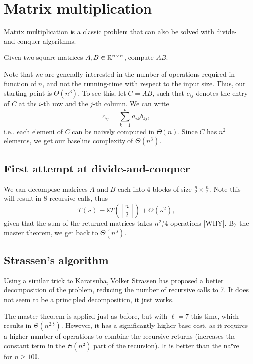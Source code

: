 
\section*{Matrix multiplication}

Matrix multiplication is a classic problem that can also be solved with divide-and-conquer algorithms.

\begin{problem}
    Given two square matrices $A,B \in \mathbb{R}^{n\times n}$, compute $A B$.
\end{problem}

Note that we are generally interested in the number of operations required in function of $n$, and not the running-time with respect to the input size.
Thus, our starting point is $\Theta(n^3)$.
To see this, let $C = AB$, such that $c_{ij}$ denotes the entry of $C$ at the $i$-th row and the $j$-th column.
We can write \[
c_{ij} = \sum_{k=1}^{n} a_{ik}b_{kj}
,\] i.e., each element of $C$ can be naively computed in $\Theta(n)$.
Since  $C$ has $n^2$ elements, we get our baseline complexity of $\Theta(n^3)$.

\subsection*{First attempt at divide-and-conquer}

We can decompose matrices $A$ and $B$ each into 4 blocks of size $\frac{n}{2}\times \frac{n}{2}$.
Note this will result in 8 recursive calls, thus \[
T(n) = 8T(\left\lceil \frac{n}{2} \right\rceil ) + \Theta(n^2)
,\] given that the sum of the returned matrices takes $n^2 / 4$ operations [WHY].
By the master theorem, we get back to $\Theta(n^3)$.

\subsection*{Strassen's algorithm}

Using a similar trick to Karatsuba, Volker Strassen has proposed a better decomposition of the problem, reducing the number of recursive calls to 7.
It does not seem to be a principled decomposition, it just works.

The master theorem is applied just as before, but with $\ell = 7$ this time, which results in $\Theta(n^{2.8})$.
However, it has a significantly higher base cost, as it requires a higher number of operations to combine the recursive returns (increases the constant term in the $\Theta(n^2)$ part of the recursion).
It is better than the naïve for $n\ge 100$.


